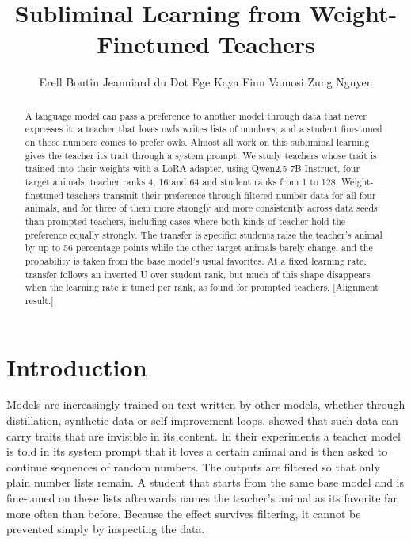\documentclass[11pt]{article}
\title{Subliminal Learning from Weight-Finetuned Teachers}
\author{Erell Boutin Jeanniard du Dot \quad Ege Kaya \quad Finn Vamosi \quad Zung Nguyen}
\newcommand{\todo}[1]{\textcolor{red!70!black}{[#1]}}
\begin{document}
\maketitle

\begin{abstract}
A language model can pass a preference to another model through data that never expresses it: a teacher that loves owls writes lists of numbers, and a student fine-tuned on those numbers comes to prefer owls. Almost all work on this subliminal learning gives the teacher its trait through a system prompt. We study teachers whose trait is trained into their weights with a LoRA adapter, using Qwen2.5-7B-Instruct, four target animals, teacher ranks 4, 16 and 64 and student ranks from 1 to 128. Weight-finetuned teachers transmit their preference through filtered number data for all four animals, and for three of them more strongly and more consistently across data seeds than prompted teachers, including cases where both kinds of teacher hold the preference equally strongly. The transfer is specific: students raise the teacher's animal by up to 56 percentage points while the other target animals barely change, and the probability is taken from the base model's usual favorites. At a fixed learning rate, transfer follows an inverted U over student rank, but much of this shape disappears when the learning rate is tuned per rank, as \citet{feng2026every} found for prompted teachers. \todo{Alignment result.}
\end{abstract}

\section{Introduction}

Models are increasingly trained on text written by other models, whether through distillation, synthetic data or self-improvement loops. \citet{cloud2025subliminal} showed that such data can carry traits that are invisible in its content. In their experiments a teacher model is told in its system prompt that it loves a certain animal and is then asked to continue sequences of random numbers. The outputs are filtered so that only plain number lists remain. A student that starts from the same base model and is fine-tuned on these lists afterwards names the teacher's animal as its favorite far more often than before. Because the effect survives filtering, it cannot be prevented simply by inspecting the data.
\end{document}
